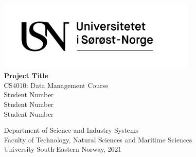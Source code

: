 \thispagestyle{empty}

\begin{center}

\includegraphics[width=10cm]{figures/logos/USN_logo_rgb.png}\\[5pc]

\textbf{\Huge{Project Title}}\\[0.1pc]

\small{CS4010: Data Management Course}\\[7pc]

\Large{Student Number}\\
\Large{Student Number}\\
\Large{Student Number}\\

\vfill

\large{Department of Science and Industry Systems}\\[1pc]
\large{Faculty of Technology, Natural Sciences and Maritime Sciences}\\[1pc]
\large{University South-Eastern Norway, 2021}\\[1pc]

\end{center}
